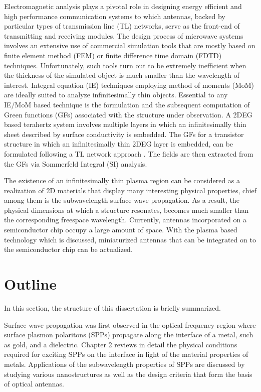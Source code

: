 Electromagnetic analysis plays a pivotal role in designing energy efficient and high performance communication systems to which antennas, backed by particular types of transmission line (TL) networks, serve as the front-end of transmitting and receiving modules. The design process of microwave systems involves an extensive use of commercial simulation tools that are mostly based on finite element method (FEM) or finite difference time domain (FDTD) techniques. Unfortunately, such tools turn out to be extremely inefficient when the thickness of the simulated object is much smaller than the wavelength of interest. Integral equation (IE) techniques employing method of moments (MoM) are ideally suited to analyze infinitesimally thin objects. Essential to any IE/MoM based technique is the formulation and the subsequent computation of Green functions (GFs) associated with the structure under observation. A 2DEG based terahertz system involves multiple layers in which an infinitesimally thin sheet described by surface conductivity is embedded. The GFs for a transistor structure in which an infinitesimally thin 2DEG layer is embedded, can be formulated following a TL network approach
\cite{Michalski1997}. The fields are then extracted from the GFs via Sommerfeld Integral (SI) analysis.

The existence of an infinitesimally thin plasma region can be considered as a realization of 2D materials that display many interesting physical properties, chief among them is the subwavelength surface wave propagation. As a result, the physical dimensions at which a structure resonates, becomes much smaller than the corresponding freespace wavelength. Currently, antennas incorporated on a semiconductor chip occupy a large amount of space. With the plasma based technology which is discussed, miniaturized antennas that can be integrated on to the semiconductor chip can be actualized.
\section{Outline}
%
In this section, the structure of this dissertation is briefly summarized.

Surface wave propagation was first observed in the optical frequency region where surface plasmon polaritons (SPPs) propagate along the interface of a metal, such as gold, and a dielectric. Chapter 2 reviews in detail the physical conditions required for exciting SPPs on the interface in light of the material properties of metals. Applications of the subwavelength properties of SPPs are discussed by studying various nanostructures as well as the design criteria that form the basis of optical antennas.

